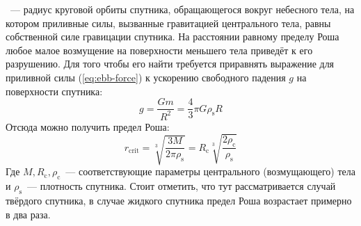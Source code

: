 ~--- радиус круговой орбиты спутника, обращающегося вокруг небесного тела, на котором приливные силы, вызванные гравитацией центрального тела, равны собственной силе гравицации спутника. На расстоянии равному пределу Роша любое малое возмущение на поверхности меньшего тела приведёт к его разрушению. Для того чтобы его найти требуется приравнять выражение для приливной силы (\ref{eq:ebb-force}) к ускорению свободного падения $g$ на поверхности спутника:
\begin{equation*}
	g=\frac{G m}{R^2}=\frac{4}{3} \pi G \rho_{\text{s}} R
\end{equation*}
Отсюда можно получить предел Роша:
\begin{equation*}
	r_{\text{crit}} = \sqrt[3]{\frac{3M}{2\pi\rho_{\text{s}}}}=R_{\text{c}} \sqrt[3]{\frac{2\rho_{\text{c}}}{\rho_{\text{s}}}}
\end{equation*}
Где $M, R_{\text{c}}, \rho_{\text{c}}$~--- соответствующие параметры центрального (возмущающего) тела и $\rho_{\text{s}}$~--- плотность спутника. Стоит отметить, что тут рассматривается случай твёрдого спутника, в случае жидкого спутника предел Роша возрастает примерно в два раза.